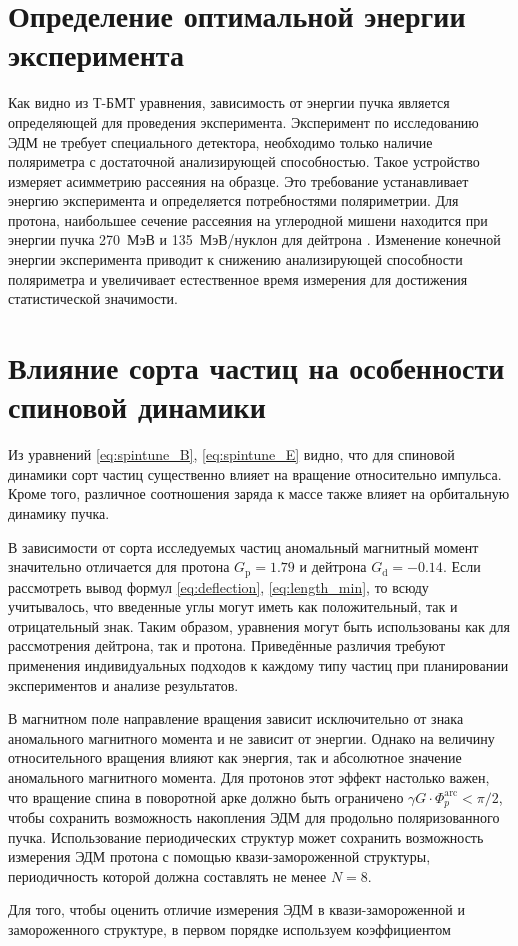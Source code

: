 	\section{Определение оптимальной энергии эксперимента}\label{sec:EDM/requirements/energy}
\par Как видно из Т-БМТ уравнения, зависимость от энергии пучка является определяющей для проведения эксперимента. Эксперимент по исследованию ЭДМ не требует специального детектора, необходимо только наличие поляриметра с достаточной анализирующей способностью. Такое устройство измеряет асимметрию рассеяния на образце. Это требование устанавливает энергию эксперимента и определяется потребностями поляриметрии. Для протона, наибольшее сечение рассеяния на углеродной мишени находится при энергии пучка 270~МэВ и 135~МэВ/нуклон для дейтрона \cite{JEDI:polarimeter, skhomenko:polarimeter}. Изменение конечной энергии эксперимента приводит к снижению анализирующей способности поляриметра и увеличивает естественное время измерения для достижения статистической значимости.

	\section{Влияние сорта частиц на особенности спиновой динамики}\label{sec:EDM/requirements/particles}

\par Из уравнений \ref{eq:spintune_B}, \ref{eq:spintune_E} видно, что для спиновой динамики сорт частиц существенно влияет на вращение относительно импульса. Кроме того, различное соотношения заряда к массе также влияет на орбитальную динамику пучка.

\par В зависимости от сорта исследуемых частиц аномальный магнитный момент значительно отличается для протона $G_{\textrm{p}}=1.79$ и дейтрона $G_{\textrm{d}}=-0.14$. Если рассмотреть вывод формул \ref{eq:deflection}, \ref{eq:length_min}, то всюду учитывалось, что введенные углы могут иметь как положительный, так и отрицательный знак. Таким образом, уравнения могут быть использованы как для рассмотрения дейтрона, так и протона. Приведённые различия требуют применения индивидуальных подходов к каждому типу частиц при планировании экспериментов и анализе результатов.

\par  В магнитном поле направление вращения зависит исключительно от знака аномального магнитного момента и не зависит от энергии. Однако на величину относительного вращения влияют как энергия, так и абсолютное значение аномального магнитного момента. Для протонов этот эффект настолько важен, что вращение спина в поворотной арке должно быть ограничено $\gamma G \cdot \Phi_{p}^{\text{arc}} < \pi/2$, чтобы сохранить возможность накопления ЭДМ для продольно поляризованного пучка. Использование периодических структур может сохранить возможность измерения ЭДМ протона с помощью квази-замороженной структуры, периодичность которой должна составлять не менее $N=8$.
\par Для того, чтобы оценить отличие измерения ЭДМ в квази-замороженной и замороженного структуре, в первом порядке используем коэффициентом \cite{Senichev:2023_nuclotron} 

